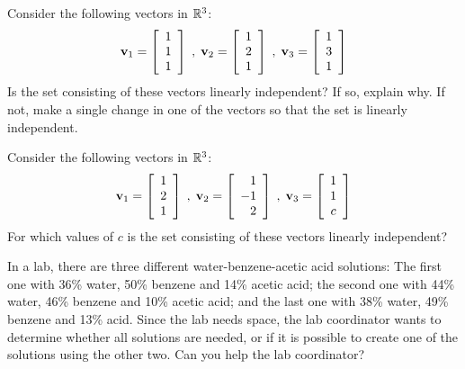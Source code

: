 
\be

\item Consider the following vectors in $\mathbb{R}^3$:
\[ \mathbf{v}_1 = \left[ \begin{array}{c} 1 \\ 1\\ 1 \end{array} \right]\; , \; \mathbf{v}_2 = \left[ \begin{array}{c} 1 \\ 2\\ 1 \end{array} \right] \; , \; \mathbf{v}_3= \left[ \begin{array}{c} 1 \\ 3\\ 1 \end{array} \right] \]
Is the set consisting of these vectors linearly independent? If so, explain why. If not, make a single change in one of the vectors so that the set is linearly independent.\\

\item Consider the following vectors in $\mathbb{R}^3$:
\[ \mathbf{v}_1 = \left[ \begin{array}{c} 1 \\ 2\\ 1 \end{array} \right]\; , \; \mathbf{v}_2 = \left[ \begin{array}{r} 1 \\ -1\\ 2 \end{array} \right] \; , \; \mathbf{v}_3= \left[ \begin{array}{c} 1 \\ 1\\ c \end{array} \right] \]
For which values of $c$ is the set consisting of these vectors linearly independent?\\

\item In a lab, there are three different water-benzene-acetic acid solutions: The first one with 36\% water, 50\% benzene and 14\% acetic acid; the second one with 44\% water, 46\% benzene and 10\% acetic acid; and the last one with 38\% water, 49\% benzene and 13\% acid. Since the lab needs space, the lab coordinator wants to determine whether all solutions are needed, or if it is possible to create one of the solutions using the other two. Can you help the lab coordinator? 

